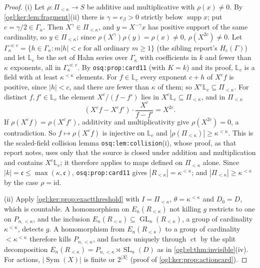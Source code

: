 \documentclass[11pt,oneside]{article}
\numberwithin{equation}{section}
\theoremstyle{definition}
\theoremstyle{remark}
\newcommand{\ct}{\operatorname{ct}}
\newcommand{\supp}{\operatorname{supp}}
\newcommand{\GL}{\operatorname{GL}}
\newcommand{\SL}{\operatorname{SL}}
\newcommand{\Sym}{\operatorname{Sym}}
\newcommand{\replabel}[1]{\nolinkurl{#1}}
\begin{document}
\begin{proof}
(i) Let $\rho:\Pi_{<\kappa}\to S$ be additive and multiplicative with
$\rho(x)\ne0$. By \cref{ogl:ker:lem:fragment}(ii) there is $\gamma=e_\beta>0$
strictly below $\supp x$; put $c=\gamma/2\in\Gamma_\kappa$. Then
$X^{\gamma}\in\Pi_{<\kappa}$, and $y=X^{-\gamma}x$ has positive support of the
same cardinality, so $y\in\Pi_{<\kappa}$; since
$\rho(X^\gamma)\rho(y)=\rho(x)\ne0$, $\rho(X^{2c})\ne0$. Let
$\Gamma_\kappa^{\ll c}=\{h\in\Gamma_\kappa:m|h|<c\text{ for all ordinary }m\ge1\}$
(the sibling report's $H_c(\Gamma)$) and let $\mathbb L_c$ be the set of Hahn
series over $\Gamma_\kappa$ with coefficients in $k$ and fewer than $\kappa$
exponents, all in $\Gamma_\kappa^{\ll c}$. By \replabel{osq:prop:card11} (with
$K=k$) and its proof, $\mathbb L_c$ is a field with at least $\kappa^{<\kappa}$
elements. For $f\in\mathbb L_c$ every exponent $c+h$ of $X^cf$ is positive, since
$|h|<c$, and there are fewer than $\kappa$ of them; so
$X^c\mathbb L_c\subseteq\Pi_{<\kappa}$. For distinct $f,f'\in\mathbb L_c$ the
element $X^c/(f-f')$ lies in $X^c\mathbb L_c\subseteq\Pi_{<\kappa}$, and in
$\Pi_{<\kappa}$
\[
 (X^cf-X^cf')\cdot\frac{X^c}{f-f'}=X^{2c}.
\]
If $\rho(X^cf)=\rho(X^cf')$, additivity and multiplicativity give
$\rho(X^{2c})=0$, a contradiction. So $f\mapsto\rho(X^cf)$ is injective on
$\mathbb L_c$ and $|\rho(\Pi_{<\kappa})|\ge\kappa^{<\kappa}$. This is the
scaled-field collision lemma \replabel{osq:lem:collision}(i), whose proof, as
that report notes, uses only that the source is closed under addition and
multiplication and contains $X^c\mathbb L_c$; it therefore applies to maps
defined on $\Pi_{<\kappa}$ alone. Since $|k|=\mathfrak c\le\max(\kappa,\mathfrak c)$,
\replabel{osq:prop:card11} gives $|R_{<\kappa}|=\kappa^{<\kappa}$; and
$|\Pi_{<\kappa}|\ge\kappa^{<\kappa}$ by the case $\rho=\mathrm{id}$.

(ii) Apply \cref{ogl:ker:prop:exactthreshold} with $I=\Pi_{<\kappa}$,
$\theta=\kappa^{<\kappa}$ and $D_0=D$, which is countable. A homomorphism on
$E_n(R_{<\kappa})$ not killing $g$ restricts to one on $P_{n,<\kappa}$, and the
inclusion $E_n(R_{<\kappa})\subseteq\GL_n(R_{<\kappa})$, a group of cardinality
$\kappa^{<\kappa}$, detects $g$. A homomorphism from $E_n(R_{<\kappa})$ to a
group of cardinality $<\kappa^{<\kappa}$ therefore kills $P_{n,<\kappa}$, and
factors uniquely through $\ct$ by the split decomposition
$E_n(R_{<\kappa})=P_{n,<\kappa}\rtimes\SL_n(D)$ as in
\cref{ogl:el:thm:invisible}(iv). For actions, $|\Sym(X)|$ is finite or
$2^{|X|}$ (proof of \cref{ogl:ker:prop:actioncard}).


\end{proof}
\end{document}
